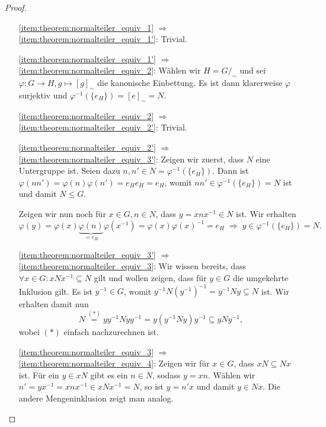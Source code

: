 \begin{proof}{\ }
    \begin{itemize}[topsep=0cm, leftmargin=2.2cm]
        \item[\ref*{item:theorem:normalteiler_equiv_1} $\Rightarrow$ \ref*{item:theorem:normalteiler_equiv_1'}:] 
        Trivial.
        
        \item[\ref*{item:theorem:normalteiler_equiv_1'} $\Rightarrow$ \ref*{item:theorem:normalteiler_equiv_2}:] 
        Wählen wir $H = G/_\sim$ und sei $\varphi: G \to H, g \mapsto [g]_\sim$ die kanonische Einbettung. Es ist dann klarerweise $\varphi$ surjektiv und $\varphi^{-1}(\{e_H\}) = [e]_\sim = N$.
        
        \item[\ref*{item:theorem:normalteiler_equiv_2} $\Rightarrow$ \ref*{item:theorem:normalteiler_equiv_2'}:] 
        Trivial.
        
        \item[\ref*{item:theorem:normalteiler_equiv_2'} $\Rightarrow$ \ref*{item:theorem:normalteiler_equiv_3'}:] 
        Zeigen wir zuerst, dass $N$ eine Untergruppe ist. Seien dazu $n, n' \in N = \varphi^{-1}(\{e_H\})$. Dann ist $\varphi(n n') = \varphi(n) \varphi(n') = e_H e_H = e_H$, womit $n n' \in \varphi^{-1}(\{e_H\}) = N$ ist und damit $N \le G$.

        Zeigen wir nun noch für $x \in G, n \in N$, dass $y = xnx^{-1} \in N$ ist. Wir erhalten $$\varphi(y) = \varphi(x) \underbrace{\varphi(n)}_{= e_H} \varphi(x^{-1}) = \varphi(x)\varphi(x)^{-1} = e_H \;\Rightarrow\; y \in \varphi^{-1}(\{e_H\}) = N.$$

        \item[\ref*{item:theorem:normalteiler_equiv_3'} $\Rightarrow$ \ref*{item:theorem:normalteiler_equiv_3}:] 
        Wir wissen bereits, dass $\forall x \in G: xNx^{-1} \subseteq N$ gilt und wollen zeigen, dass für $y \in G$ die umgekehrte Inklusion gilt. Es ist $y^{-1} \in G$, womit $y^{-1}N(y^{-1})^{-1} = y^{-1}Ny \subseteq N$ ist. Wir erhalten damit nun 
        $$ N \overset{(*)}{=} y y^{-1} N y y^{-1} = y (y^{-1} N y) y^{-1} \subseteq y N y^{-1}, $$
        wobei $(*)$ einfach nachzurechnen ist.
        
        \item[\ref*{item:theorem:normalteiler_equiv_3} $\Rightarrow$ \ref*{item:theorem:normalteiler_equiv_4}:] 
        Zeigen wir für $x \in G$, dass $xN \subseteq Nx$ ist. Für ein $y \in xN$ gibt es ein $n \in N$, sodass $y = xn$. Wählen wir $n' = yx^{-1} = xnx^{-1} \in xNx^{-1} = N$, so ist $y = n'x$ und damit $y \in Nx$. Die andere Mengeninklusion zeigt man analog. 
        

\end{itemize}
\end{proof}
